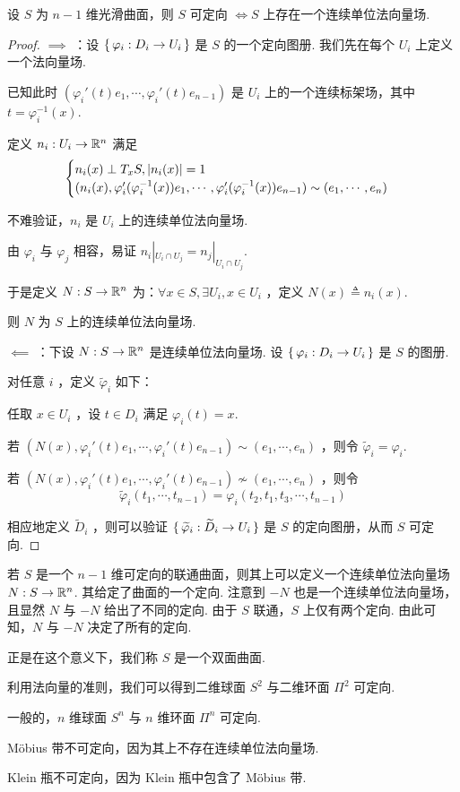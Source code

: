 \begin{property}
设 $S$ 为 $n-1$ 维光滑曲面，则 $S$ 可定向 $\iff S$ 上存在一个连续单位法向量场.
\end{property}
\begin{proof}
$\implies$ ：设 $\set{\varphi_i:D_i\to U_i}$ 是 $S$ 的一个定向图册. 我们先在每个 $U_i$ 上定义一个法向量场.

已知此时 $(\varphi_i'(t)e_1,\cdots,\varphi_i'(t)e_{n-1})$ 是 $U_i$ 上的一个连续标架场，其中 $t=\varphi_i^{-1}(x)$.

定义 $n_i:U_i\to\mathbb{R}^n$ 满足
$$
\begin{cases}
n_i(x)\perp T_xS,\lvert{n_i(x)}\rvert=1\\
(n_i(x),\varphi_i'(\varphi_i^{-1}(x))e_1,\cdots,\varphi_i'(\varphi_i^{-1}(x))e_{n-1})\sim(e_1,\cdots,e_n)
\end{cases}
$$

不难验证，$n_i$ 是 $U_i$ 上的连续单位法向量场.

由 $\varphi_i$ 与 $\varphi_j$ 相容，易证 $n_i|_{U_i\cap U_j}=n_j|_{U_i\cap U_j}$.

于是定义 $N:S\to\mathbb{R}^n$ 为：$\forall x\in S,\exists U_i,x\in U_i$ ，定义 $N(x)\triangleq n_i(x)$.

则 $N$ 为 $S$ 上的连续单位法向量场.

$\impliedby$ ：下设 $N:S\to\mathbb{R}^n$ 是连续单位法向量场. 设 $\set{\varphi_i:D_i\to U_i}$ 是 $S$ 的图册.

对任意 $i$ ，定义 $\widetilde\varphi_i$ 如下：

任取 $x\in U_i$ ，设 $t\in D_i$ 满足 $\varphi_i(t)=x$.

若 $(N(x),\varphi_i'(t)e_1,\cdots,\varphi_i'(t)e_{n-1})\sim(e_1,\cdots,e_n)$ ，则令 $\widetilde\varphi_i=\varphi_i$.

若 $(N(x),\varphi_i'(t)e_1,\cdots,\varphi_i'(t)e_{n-1})\not\sim(e_1,\cdots,e_n)$ ，则令
$$
\widetilde\varphi_i(t_1,\cdots,t_{n-1})=\varphi_i(t_2,t_1,t_3,\cdots,t_{n-1})
$$

相应地定义 $\widetilde{D}_i$ ，则可以验证 $\set{\widetilde\varphi_i:\widetilde{D}_i\to U_i}$ 是 $S$ 的定向图册，从而 $S$ 可定向.
\end{proof}

若 $S$ 是一个 $n-1$ 维可定向的联通曲面，则其上可以定义一个连续单位法向量场 $N:S\to\mathbb{R}^n$. 其给定了曲面的一个定向.
注意到 $-N$ 也是一个连续单位法向量场，且显然 $N$ 与 $-N$ 给出了不同的定向.
由于 $S$ 联通，$S$ 上仅有两个定向. 由此可知，$N$ 与 $-N$ 决定了所有的定向.

正是在这个意义下，我们称 $S$ 是一个双面曲面.

利用法向量的准则，我们可以得到二维球面 $S^2$ 与二维环面 $\Pi^2$ 可定向.

一般的，$n$ 维球面 $S^n$ 与 $n$ 维环面 $\Pi^n$ 可定向.

\begin{example}
Möbius 带不可定向，因为其上不存在连续单位法向量场.
\end{example}

\begin{example}
Klein 瓶不可定向，因为 Klein 瓶中包含了 Möbius 带.
\end{example}